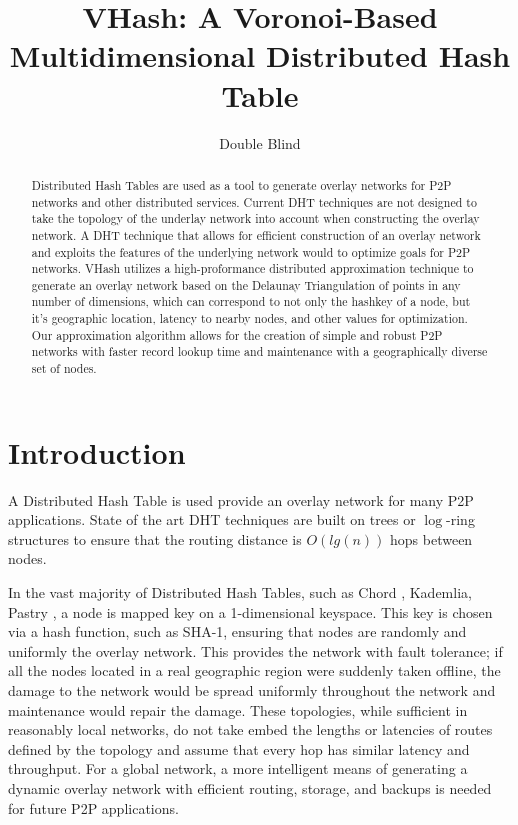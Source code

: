 \documentclass{IEEEtran}
\title{VHash: A Voronoi-Based Multidimensional Distributed Hash Table}
\author{Double Blind}
\date{} %
\begin{document}
\maketitle

\begin{abstract}
Distributed Hash Tables are used as a tool to generate overlay networks for P2P networks and other distributed services.
Current DHT techniques are not designed to take the topology of the underlay network into account when constructing the overlay network.
A DHT technique that allows for efficient construction of an overlay network and exploits the features of the underlying network would to optimize goals for P2P networks. 
VHash utilizes a high-proformance distributed approximation technique to generate an overlay network based on the Delaunay Triangulation of points in any number of dimensions, which can correspond to not only the hashkey of a node, but it's geographic location, latency to nearby nodes, and other values for optimization.
Our approximation algorithm allows for the creation of simple and robust P2P networks with faster record lookup time and maintenance with a geographically diverse set of nodes.  


\end{abstract}

\section{Introduction}
A Distributed Hash Table is used provide an overlay network for many P2P applications. State of the art DHT techniques are built on trees or $\log$-ring structures to ensure that the routing distance is $O(lg(n))$ hops between nodes. 

In the vast majority of Distributed Hash Tables, such as Chord \cite{chord}, Kademlia\cite{kademlia}, Pastry \cite{pastry}, a node is mapped key on a 1-dimensional keyspace.  This key is chosen via a hash function, such as SHA-1, ensuring that nodes are randomly and uniformly the overlay network.
This provides the network with fault tolerance; if all the nodes located in a real geographic region were suddenly taken offline, the damage to the network would be spread uniformly throughout the network and maintenance would repair the damage.  
These topologies, while sufficient in reasonably local networks, do not take embed the lengths or latencies of routes defined by the topology and assume that every hop has similar latency and throughput. For a global network, a more intelligent means of generating a dynamic overlay network with efficient routing, storage, and backups is needed for future P2P applications.
 
\end{document}
